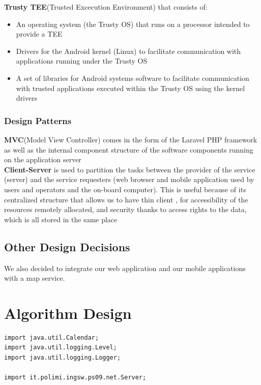 \documentclass{article}
\begin{document}
\begin{flushleft}
\textbf{Trusty TEE}(Trusted Excecution Environment) that consists of:
\begin{itemize}
\item An operating system (the Trusty OS) that runs on a processor intended to provide a TEE
\item Drivers for the Android kernel (Linux) to facilitate communication with applications running under the Trusty OS
\item A set of libraries for Android systems software to facilitate communication with trusted applications executed within the Trusty OS using the kernel drivers

\end{itemize} 
\vspace{1cm}



\subsubsection{Design Patterns}

\textbf{MVC}(Model View Controller) comes in the form of the Laravel PHP framework as well as the internal component structure of the software components running on the application server\\
\textbf{Client-Server}  is used to partition the tasks between the provider of the service (server) and the service requesters (web browser and mobile application used by users and operators and the on-board computer). This is useful because of its centralized structure that allows us to have thin client , for accessibility of the resources remotely allocated, and security  thanks to access rights to the data, which is all stored in the same place


\subsection{Other Design Decisions} %
We also decided to integrate our web application and our mobile applications with a map service.

\section{Algorithm Design} %
\begin{lstlisting}
import java.util.Calendar;
import java.util.logging.Level;
import java.util.logging.Logger;

import it.polimi.ingsw.ps09.net.Server;


\end{lstlisting}
\end{flushleft}
\end{document}
